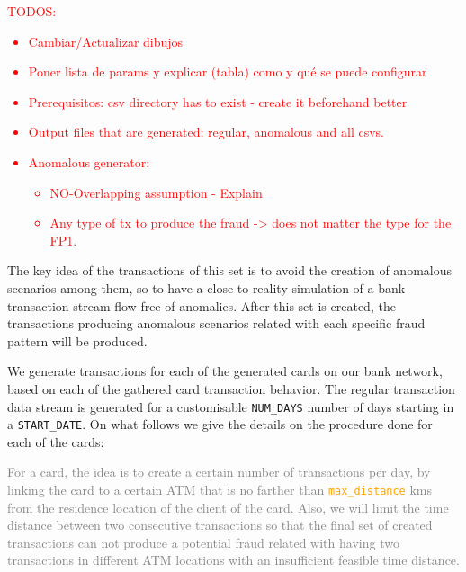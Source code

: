 \documentclass{article}
\begin{document}
\textcolor{red}{TODOS:
\begin{itemize}
\item Cambiar/Actualizar dibujos
\item Poner lista de params y explicar (tabla) como y qué se puede configurar
\item Prerequisitos: csv directory has to exist - create it beforehand better
\item Output files that are generated: regular, anomalous and all csvs.
\item Anomalous generator:
\begin{itemize}
  \item NO-Overlapping assumption - Explain
  \item Any type of tx to produce the fraud -> does not matter the type for the FP1.
\end{itemize}
\end{itemize}
}

The key idea of the transactions of this set is to avoid the creation of anomalous scenarios among them, so to have a close-to-reality simulation of a bank transaction stream flow free of anomalies. After this set is created, the transactions producing anomalous scenarios related with each specific fraud pattern will be produced.


We generate transactions for each of the generated cards on our bank network, based on each of the gathered card transaction behavior. The regular transaction data stream is generated for a customisable \texttt{NUM\_DAYS} number of days starting in a \texttt{START\_DATE}. On what follows we give the details on the procedure done for each of the cards:

\textcolor{gray}{
For a card, the idea is to create a certain 
number of transactions per day, by linking the card to a certain ATM that is no farther 
than \textcolor{orange}{\texttt{max\_distance}} kms from the residence location of the 
client of the card. Also, we will limit the time distance between two consecutive 
transactions so that the final set of created transactions can not produce a potential 
fraud related with having two transactions in different ATM locations with an insufficient 
feasible time distance.
}
\end{document}
